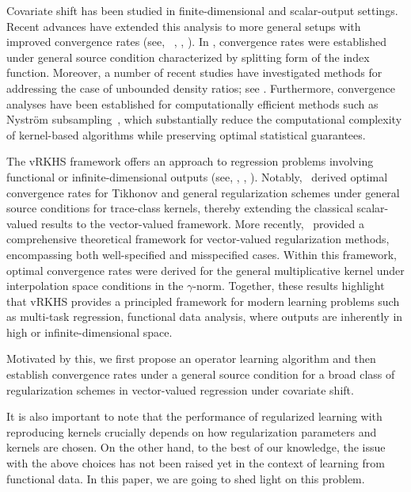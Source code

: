 \documentclass[twoside,11pt]{article}
\begin{document}
\noindent

\vspace{0.5em}

Covariate shift has been studied in finite-dimensional and
scalar-output settings.
Recent advances have extended this analysis to more general setups with improved convergence rates
(see, ~\cite{DBLP:conf/iclr/DinuHBNHEMPHZ23}, \cite{Profsergie2022}, \cite{shimodaira2000improving}).
In \cite{Profsergie2022}, convergence rates were established under general source condition characterized by splitting form of the index function. Moreover, a number of recent studies have investigated methods for addressing the case of unbounded density ratios; see \cite{gogolashvili2023importance, ma2023optimally, fan2025spectral, liu2025spectral}. Furthermore, convergence analyses have been established for
computationally efficient methods such as Nyström subsampling~\cite{covnystrom}, which substantially reduce
the computational complexity of kernel-based algorithms while preserving optimal statistical guarantees.  

\vspace{0.4em}

The vRKHS framework offers an approach to regression problems involving functional or infinite-dimensional outputs (see, \cite{VRKHS_REF}, \cite{rastogi2017optimal}, \cite{meunier2024optimal}). Notably,~\cite{rastogi2017optimal} derived optimal convergence rates for Tikhonov and general regularization schemes under general source conditions for trace-class kernels, thereby extending the classical scalar-valued results to the vector-valued framework. More recently,~\cite{meunier2024optimal} provided a comprehensive theoretical framework for
vector-valued regularization methods, encompassing both well-specified and misspecified cases.
Within this framework, optimal convergence rates were derived for the general multiplicative kernel under interpolation space conditions in the $\gamma$-norm. Together, these results highlight that  vRKHS provides a principled framework for modern learning problems such as multi-task regression, functional data analysis, where outputs are inherently in high or infinite-dimensional space. 

Motivated by this, we first propose an operator learning algorithm and then establish convergence rates under a general source condition for a broad class of regularization schemes in vector-valued regression under covariate shift.

It is also important to note that the performance of regularized learning with reproducing kernels crucially depends on how regularization parameters and kernels are chosen. On the other hand, to the best of our knowledge, the issue with the above choices has not been raised yet in the context of learning from functional data. In this paper, we are going to shed light on this problem.
\end{document}
